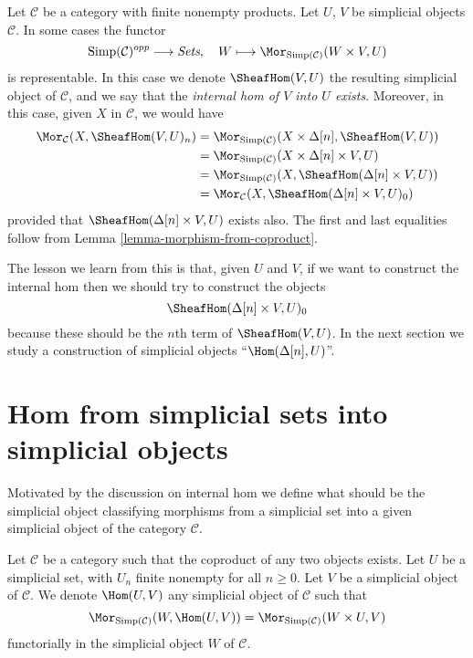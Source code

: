 \noindent
Let $\mathcal{C}$ be a category with finite nonempty
products. Let $U$, $V$ be simplicial objects $\mathcal{C}$.
In some cases the functor
$$
\text{Simp}(\mathcal{C})^{opp} \longrightarrow \textit{Sets}, \quad
W \longmapsto \Mor_{\text{Simp}(\mathcal{C})}(W \times V, U)
$$
is representable. In this case we denote $\SheafHom(V, U)$
the resulting simplicial object of $\mathcal{C}$, and we say
that the {\it internal hom of $V$ into $U$ exists}. Moreover,
in this case, given $X$ in $\mathcal{C}$, we would have
\begin{align*}
\Mor_\mathcal{C}(X, \SheafHom(V, U)_n)
& =
\Mor_{\text{Simp}(\mathcal{C})}(X \times \Delta[n], \SheafHom(V, U)) \\
& =
\Mor_{\text{Simp}(\mathcal{C})}(X \times \Delta[n]\times V, U) \\
& =
\Mor_{\text{Simp}(\mathcal{C})}(X, \SheafHom(\Delta[n] \times V, U)) \\
& =
\Mor_\mathcal{C}(X, \SheafHom(\Delta[n] \times V, U)_0)
\end{align*}
provided that $\SheafHom(\Delta[n] \times V, U)$
exists also. The first and last equalities follow from
Lemma \ref{lemma-morphism-from-coproduct}.

\medskip\noindent
The lesson we learn from this is that, given $U$ and $V$,
if we want to construct the internal hom then we should try to
construct the objects
$$
\SheafHom(\Delta[n] \times V, U)_0
$$
because these should be the $n$th term of $\SheafHom(V, U)$.
In the next section we study a construction of simplicial objects
``$\Hom(\Delta[n], U)$''.


\section{Hom from simplicial sets into simplicial objects}
\label{section-hom-from-simplicial-sets}

\noindent
Motivated by the discussion on internal hom we define
what should be the simplicial object classifying
morphisms from a simplicial set into a given
simplicial object of the category $\mathcal{C}$.

\begin{definition}
\label{definition-hom-from-simplicial-set}
Let $\mathcal{C}$ be a category such that the coproduct
of any two objects exists.
Let $U$ be a simplicial set, with $U_n$ finite nonempty
for all $n \geq 0$.
Let $V$ be a simplicial object of $\mathcal{C}$.
We denote {\it $\Hom(U, V)$} any simplicial object of
$\mathcal{C}$ such that
$$
\Mor_{\text{Simp}(\mathcal{C})}(W, \Hom(U, V))
=
\Mor_{\text{Simp}(\mathcal{C})}(W \times U, V)
$$
functorially in the simplicial object $W$ of $\mathcal{C}$.
\end{definition}

